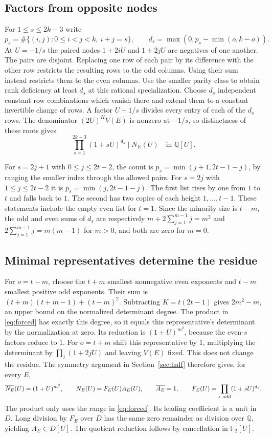 \documentclass[10pt]{article}
\newcommand{\Q}{\mathbb Q}
\newcommand{\Fp}{\mathbb F}
\begin{document}
\subsection{Factors from opposite nodes}
For $1\le s\le 2k-3$ write
\[
 p_s=\#\{(i,j):0\le i<j<k,\ i+j=s\},\qquad
 d_s=\max(0,p_s-\min(o,k-o)).
\]
At $U=-1/s$ the paired nodes $1+2iU$ and $1+2jU$ are negatives of
one another. The pairs are disjoint. Replacing one row of each pair
by its difference with the other row restricts the resulting rows to
the odd columns. Using their sum instead restricts them to the even
columns. Use the smaller parity class to obtain rank deficiency at
least $d_s$ at this rational specialization. Choose $d_s$ independent
constant row combinations which vanish there and extend them to a
constant invertible change of rows. A factor $U+1/s$ divides every
entry of each of the $d_s$ rows. The denominator $(2U)^K V(E)$ is
nonzero at $-1/s$, so distinctness of these roots gives
\begin{equation}\label{eq:forced}
 \prod_{s=1}^{2k-3}(1+sU)^{d_s}\mid N_E(U)\quad\text{in }\Q[U].
\end{equation}

For $s=2j+1$ with $0\le j\le 2t-2$, the count is
$p_s=\min(j+1,2t-1-j)$, by ranging the smaller index through the
allowed pairs. For $s=2j$ with $1\le j\le 2t-2$ it is
$p_s=\min(j,2t-1-j)$.
The first list rises by one from $1$ to $t$ and falls back to $1$.
The second has two copies of each height $1,\ldots,t-1$.
These statements include the empty even list for $t=1$.
Since the minority size is $t-m$, the odd and even sums of $d_s$
are respectively $m+2\sum_{j=1}^{m-1}j=m^2$ and
$2\sum_{j=1}^{m-1}j=m(m-1)$ for $m>0$, and both are zero for $m=0$.

\subsection{Minimal representatives determine the residue}
For $o=t-m$, choose the $t+m$ smallest nonnegative even exponents and
$t-m$ smallest positive odd exponents. Their sum is
$(t+m)(t+m-1)+(t-m)^2$. Subtracting $K=t(2t-1)$ gives $2m^2-m$,
an upper bound on the normalized determinant degree. The product
in \eqref{eq:forced} has exactly this degree, so it equals this
representative's determinant by the normalization at zero.
Its reduction is $(1+U)^{m^2}$, because the even-$s$ factors reduce
to $1$. For $o=t+m$ shift this representative by $1$,
multiplying the determinant by $\prod_j(1+2jU)$ and leaving $V(E)$
fixed. This does not change the residue. The symmetry argument in
Section~\ref{sec:half} therefore gives, for every $E$,
\[
 \overline{N_E}(U)=(1+U)^{m^2},\qquad
 N_E(U)=F_E(U)A_E(U),\qquad \overline{A_E}=1,\qquad
 F_E(U)=\prod_{s\ {\rm odd}}(1+sU)^{d_s}.
\]
The product only uses the range in \eqref{eq:forced}. Its leading
coefficient is a unit in $D$. Long division by $F_E$ over $D$
has the same zero remainder as division over $\Q$, yielding
$A_E\in D[U]$. The quotient reduction follows by cancellation
in $\Fp_2[U]$.
\end{document}
